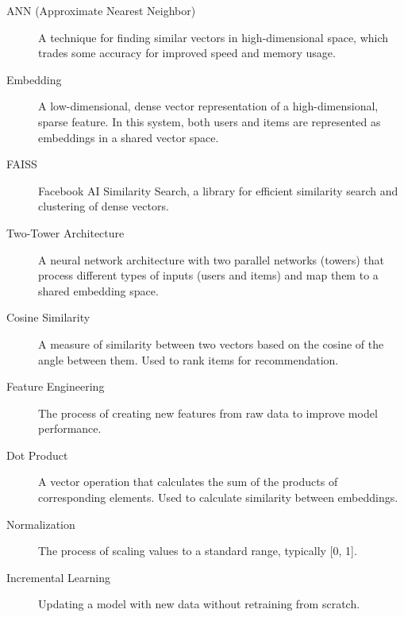 \documentclass[12pt, a4paper, oneside]{book}
\begin{document}
\begin{description}
    \item[ANN (Approximate Nearest Neighbor)] A technique for finding similar vectors in high-dimensional space, which trades some accuracy for improved speed and memory usage.
    
    \item[Embedding] A low-dimensional, dense vector representation of a high-dimensional, sparse feature. In this system, both users and items are represented as embeddings in a shared vector space.
    
    \item[FAISS] Facebook AI Similarity Search, a library for efficient similarity search and clustering of dense vectors.
    
    \item[Two-Tower Architecture] A neural network architecture with two parallel networks (towers) that process different types of inputs (users and items) and map them to a shared embedding space.
    
    \item[Cosine Similarity] A measure of similarity between two vectors based on the cosine of the angle between them. Used to rank items for recommendation.
    
    \item[Feature Engineering] The process of creating new features from raw data to improve model performance.
    
    \item[Dot Product] A vector operation that calculates the sum of the products of corresponding elements. Used to calculate similarity between embeddings.
    
    \item[Normalization] The process of scaling values to a standard range, typically [0, 1].
    
    \item[Incremental Learning] Updating a model with new data without retraining from scratch.
\end{description}

\backmatter
\end{document}
